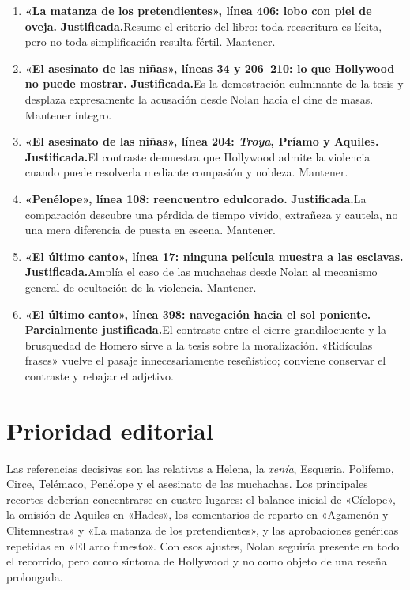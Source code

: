 \documentclass[11pt,a4paper]{article}
\newcommand{\justificada}{\textbf{Justificada.}}
\newcommand{\parcial}{\textbf{Parcialmente justificada.}}
\begin{document}
\begin{enumerate}
\item \textbf{«La matanza de los pretendientes», línea 406: lobo con piel de oveja.} \justificada Resume el criterio del libro: toda reescritura es lícita, pero no toda simplificación resulta fértil. Mantener.

\item \textbf{«El asesinato de las niñas», líneas 34 y 206--210: lo que Hollywood no puede mostrar.} \justificada Es la demostración culminante de la tesis y desplaza expresamente la acusación desde Nolan hacia el cine de masas. Mantener íntegro.

\item \textbf{«El asesinato de las niñas», línea 204: \emph{Troya}, Príamo y Aquiles.} \justificada El contraste demuestra que Hollywood admite la violencia cuando puede resolverla mediante compasión y nobleza. Mantener.

\item \textbf{«Penélope», línea 108: reencuentro edulcorado.} \justificada La comparación descubre una pérdida de tiempo vivido, extrañeza y cautela, no una mera diferencia de puesta en escena. Mantener.

\item \textbf{«El último canto», línea 17: ninguna película muestra a las esclavas.} \justificada Amplía el caso de las muchachas desde Nolan al mecanismo general de ocultación de la violencia. Mantener.

\item \textbf{«El último canto», línea 398: navegación hacia el sol poniente.} \parcial El contraste entre el cierre grandilocuente y la brusquedad de Homero sirve a la tesis sobre la moralización. «Ridículas frases» vuelve el pasaje innecesariamente reseñístico; conviene conservar el contraste y rebajar el adjetivo.

\end{enumerate}

\section*{Prioridad editorial}

Las referencias decisivas son las relativas a Helena, la \emph{xenía}, Esqueria, Polifemo, Circe, Telémaco, Penélope y el asesinato de las muchachas. Los principales recortes deberían concentrarse en cuatro lugares: el balance inicial de «Cíclope», la omisión de Aquiles en «Hades», los comentarios de reparto en «Agamenón y Clitemnestra» y «La matanza de los pretendientes», y las aprobaciones genéricas repetidas en «El arco funesto». Con esos ajustes, Nolan seguiría presente en todo el recorrido, pero como síntoma de Hollywood y no como objeto de una reseña prolongada.
\end{document}
